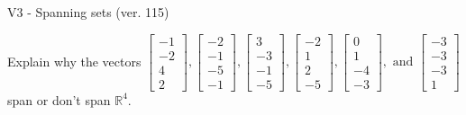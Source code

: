 \begin{exercise}
  \begin{exerciseTitle}V3 - Spanning sets (ver. 115)\end{exerciseTitle}
  \begin{exerciseStatement}
    Explain why the vectors \(\left[\begin{array}{r}
-1 \\
-2 \\
4 \\
2
\end{array}\right] , \left[\begin{array}{r}
-2 \\
-1 \\
-5 \\
-1
\end{array}\right] , \left[\begin{array}{r}
3 \\
-3 \\
-1 \\
-5
\end{array}\right] , \left[\begin{array}{r}
-2 \\
1 \\
2 \\
-5
\end{array}\right] , \left[\begin{array}{r}
0 \\
1 \\
-4 \\
-3
\end{array}\right] , \text{ and } \left[\begin{array}{r}
-3 \\
-3 \\
-3 \\
1
\end{array}\right]\) span or don't span \(\mathbb{R}^4\). 
	



\end{exerciseStatement}
\end{exercise}
